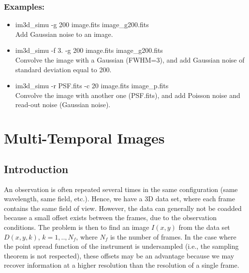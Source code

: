 \subsubsection*{Examples:}
\begin{itemize}
\item im3d\_simu -g 200 image.fits image\_g200.fits \\
Add Gaussian noise to an image.
\item im3d\_simu -f 3. -g 200 image.fits image\_g200.fits \\
Convolve the image with a Gaussian (FWHM=3), and add Gaussian noise of
standard deviation equal to 200.
\item im3d\_simu -r PSF.fits -c 20 image.fits image\_p.fits \\
Convolve the image with another one (PSF.fits), and add Poisson
noise and read-out noise (Gaussian noise).
\end{itemize}

\section{Multi-Temporal Images}
\subsection{Introduction}
An observation is often repeated several times in the same configuration
(same wavelength, same field, etc.). Hence, we have a 3D data set, where 
each frame contains the same field of view. 
However, the data can generally not
be coadded because a small offset exists between the frames, due to 
the observation conditions. The problem is then to find an image $I(x,y)$
from the data set $D(x,y,k)$, $k=1,..,N_f$, where $N_f$ is the number of
frames. In the case where the point spread function of the instrument 
is undersampled (i.e., the sampling theorem is not respected), these offsets 
may be an advantage because we may
recover information at a higher resolution than the resolution of a 
single frame.

